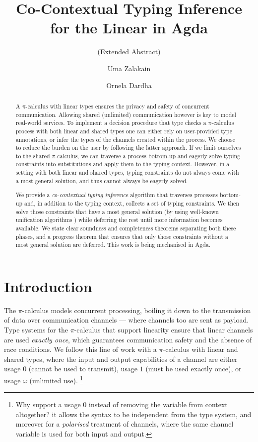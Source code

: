 \documentclass[sigplan,screen,review]{acmart}
\title
[Co-Contextual Typing Inference for the Linear \Picalc{} in Agda]
{Co-Contextual Typing Inference \\ for the Linear \Picalc{} in Agda}
\subtitle{(Extended Abstract)}
\author{Uma Zalakain}
\affiliation{University of Glasgow}
\author{Ornela Dardha}
\affiliation{University of Glasgow}
\theoremstyle{definition}\newtheorem{mytheorem}{Theorem}[section]
\newcommand{\picalc}{$\pi$-calculus}
\begin{document}
\begin{abstract}
  A \picalc{} with linear types ensures the privacy and safety of concurrent communication.
  Allowing shared (unlimited) communication however is key to model real-world services.
  To implement a decision procedure that type checks a \picalc{} process with both linear and shared types one can either rely on user-provided type annotations, or infer the types of the channels created within the process.
  We choose to reduce the burden on the user by following the latter approach.
  If we limit ourselves to the shared \picalc{}, we can traverse a process bottom-up and eagerly solve typing constraints into substitutions and apply them to the typing context.
  However, in a setting with both linear and shared types, typing constraints do not always come with a most general solution, and thus cannot always be eagerly solved.

  We provide a \emph{co-contextual typing inference} \cite{ErdwegBKKM15} algorithm that traverses processes bottom-up and, in addition to the typing context, collects a set of typing constraints.
  We then solve those constraints that have a most general solution (by using well-known unification algorithms \cite{McBride03}) while deferring the rest until more information becomes available.
  We state clear soundness and completeness theorems separating both these phases, and a progress theorem that ensures that only those constraints without a most general solution are deferred.
  This work is being mechanised in Agda.
\end{abstract}


\maketitle

\section{Introduction}\label{introduction}

The \picalc{} \cite{MilnerPW92a,Milner99} models concurrent processing, boiling it down to the transmission of data over communication channels --- where channels too are sent as payload.
Type systems for the \picalc{} that support linearity \cite{KobayashiPT96} ensure that linear channels are used \emph{exactly once}, which guarantees communication safety and the absence of race conditions.
We follow this line of work with a \picalc{} with linear and shared types, where the input and output capabilities of a channel are either usage $0$ (cannot be used to transmit), usage $1$ (must be used exactly once), or usage $\omega$ (unlimited use).
\footnote{
  Why support a usage $0$ instead of removing the variable from context altogether? it allows the syntax to be independent from the type system, and moreover for a \emph{polarised} treatment of channels, where the same channel variable is used for both input and output.
  }
\end{document}
